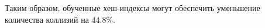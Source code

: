 Таким образом, обученные хеш-индексы могут обеспечить уменьшение количества
коллизий на $44.8\%$.


%
